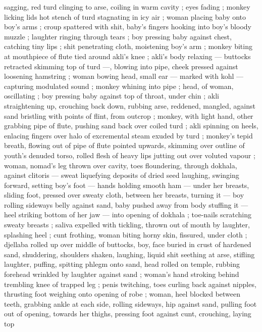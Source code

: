 sagging, red turd clinging to arse, coiling in warm cavity ; eyes fading 
; monkey licking lids {\col} hot stench of turd stagnating in icy air ; woman 
placing baby onto boy's arms ; croup spattered with shit, baby's 
fingers hooking into boy's bloody muzzle ; laughter ringing through 
tears ; boy pressing baby against chest, catching tiny lips ; shit 
penetrating cloth, moistening boy's arm ; monkey biting at 
mouthpiece of flute tied around akli's knee ; akli's body relaxing --- 
buttocks retracted skimming top of turd ---, blowing into pipe, cheek 
pressed against loosening hamstring ; woman bowing head, small ear 
--- marked with kohl --- capturing modulated sound ; monkey 
whining into pipe ; head, of woman, oscillating ; boy pressing baby 
against top of throat, under chin ; akli straightening up, crouching 
back down, rubbing arse, reddened, mangled, against sand bristling 
with points of flint, from outcrop ; monkey, with light hand, other 
grabbing pipe of flute, pushing sand back over coiled turd ; akli 
spinning on heels, enlacing fingers over halo of excremental steam 
exuded by turd ; monkey's tepid breath, flowing out of pipe of flute 
pointed upwards, skimming over outline of youth's denuded torso, 
rolled flesh of heavy lips jutting out over voluted vapour ; woman, 
nomad's leg thrown over cavity, toes floundering, through dokhala, 
against clitoris --- sweat liquefying deposits of dried seed {\dashcom}
laughing, swinging forward, setting boy's foot --- hands holding 
smooth ham --- under her breasts, sliding foot, pressed over sweaty 
cloth, between her breasts, turning it --- boy rolling sideways belly 
against sand, baby pushed away from body {\dashcom} stuffing it --- heel 
striking bottom of her jaw --- into opening of dokhala ; toe-nails 
scratching sweaty breasts ; saliva expelled with tickling, thrown out 
of mouth by laughter, splashing heel ; cunt frothing, woman biting 
horny skin, fissured, under cloth ; djellaba rolled up over middle of 
buttocks, boy, face buried in crust of hardened sand, shuddering, 
shoulders shaken, laughing, liquid shit seething at arse, stifling 
laughter, puffing, spitting phlegm onto sand, head rolled on temple, 
rubbing forehead wrinkled by laughter against sand ; woman's hand 
stroking behind trembling knee of trapped leg ; penis twitching, toes 
curling back against nipples, thrusting foot weighing onto opening of 
robe ; woman, heel blocked between teeth, grabbing ankle at each 
side, rolling sideways, hip against sand, pulling foot out of opening, 
towards her thighs, pressing foot against cunt, crouching, laying top 
